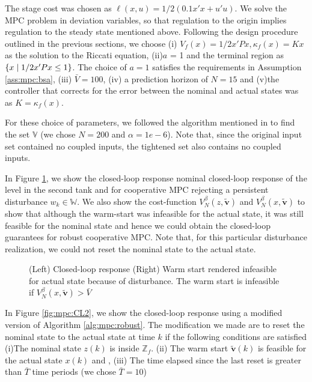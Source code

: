 The stage cost was chosen as $\ell(x,u) = 1/2(0.1 x'x + u'u)$. We solve the
MPC problem in deviation variables, so that regulation to the origin
implies regulation to the steady state mentioned above. Following
the design procedure outlined in the previous sections, we choose 
(i) $V_f(x) = 1/2x'Px,\kappa_f(x) = Kx$ as the solution to the Riccati
equation, 
(ii)$a$ = 1 and the terminal region as $\left\lbrace x \mid 1/2x'Px \leq 1 \right\rbrace$. The choice of
  $a=1$ satisfies the requirements in Assumption \ref{ass:mpc:bsa}, (iii)
$\bar{V} = 100$, (iv) a prediction horizon of $N=15$ and (v)the controller that corrects for the error between the nominal
  and actual states was as $K = \kappa_f(x)$.

For these choice of parameters, we followed the algorithm mentioned in
\citet{rakovic:kerrigan:kouramas:mayne:2003} to find the set
$\mathbb{V}$ (we chose $N=200$ and $\alpha = 1e-6$). Note that, since the original input set contained no
coupled inputs, the tightened set also contains no coupled inputs. 

In Figure \ref{fig:mpc:CL1}, we show the closed-loop response 
nominal closed-loop response of the level in the second tank and for cooperative MPC rejecting a
persistent disturbance $w_k \in \mathbb{W}$.  We also show the cost-function $V^\beta_N(z,\tilde{\mathbf{v}})$ and
$V_N^\beta(x,\tilde{\mathbf{v}})$ to show that although the warm-start was
infeasible for the actual state, it was still feasible for the nominal
state and hence we could obtain the closed-loop guarantees for robust
cooperative MPC. Note that, for this particular disturbance
realization, we could not reset the nominal state to the actual state.

\begin{figure}
\centering
\scriptsize
\resizebox{1\textwidth}{!}{}
\caption{(Left) Closed-loop response (Right) Warm start rendered
  infeasible for actual state because of disturbance. The warm start
  is infeasible if $V_N^\beta(x,\tilde{\mathbf{v}})> \bar{V}$}
\label{fig:mpc:CL1}
\end{figure}


In Figure \ref{fig:mpc:CL2}, we show the closed-loop response using a
modified version of Algorithm \ref{alg:mpc:robust}. The modification we
made are to reset the nominal state to the actual state at time $k$ if the
following conditions are satisfied (i)The nominal state $z(k)$ is inside $\mathbb{Z}_f$.
(ii) The warm start $\tilde{\mathbf{v}}(k)$ is feasible for the
actual state $x(k)$ and , (iii) The time elapsed since the last reset
is greater than $\bar{T}$
time periods (we chose $\bar{T} = 10$)

